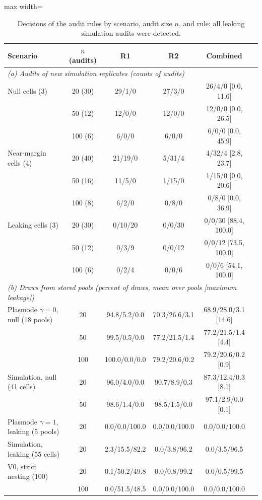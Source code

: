 \documentclass[final,1p,times]{elsarticle}
\begin{document}
\begin{table}[!htb]
\caption{Decisions of the audit rules by scenario, audit size $n$, and rule: all leaking simulation audits were detected.}\label{tab:oc}
\centering\scriptsize
\setlength{\tabcolsep}{2.5pt}
\begin{adjustbox}{max width=\textwidth}
\begin{tabular}{p{}ccccc}
\toprule
Scenario & $n$ (audits) & R1 & R2 & Combined \\
\midrule
\multicolumn{5}{l}{\textit{(a) Audits of new simulation replicates (counts of audits)}} \\
Null cells (3) & 20 (30) & 29/1/0 & 27/3/0 & 26/4/0 [0.0, 11.6] \\
 & 50 (12) & 12/0/0 & 12/0/0 & 12/0/0 [0.0, 26.5] \\
 & 100 (6) & 6/0/0 & 6/0/0 & 6/0/0 [0.0, 45.9] \\
Near-margin cells (4) & 20 (40) & 21/19/0 & 5/31/4 & 4/32/4 [2.8, 23.7] \\
 & 50 (16) & 11/5/0 & 1/15/0 & 1/15/0 [0.0, 20.6] \\
 & 100 (8) & 6/2/0 & 0/8/0 & 0/8/0 [0.0, 36.9] \\
Leaking cells (3) & 20 (30) & 0/10/20 & 0/0/30 & 0/0/30 [88.4, 100.0] \\
 & 50 (12) & 0/3/9 & 0/0/12 & 0/0/12 [73.5, 100.0] \\
 & 100 (6) & 0/2/4 & 0/0/6 & 0/0/6 [54.1, 100.0] \\
\midrule
\multicolumn{5}{l}{\textit{(b) Draws from stored pools (percent of draws, mean over pools [maximum leakage])}} \\
Plasmode $\gamma=0$, null (18 pools) & 20 & 94.8/5.2/0.0 & 70.3/26.6/3.1 & 68.9/28.0/3.1 [14.6] \\
 & 50 & 99.5/0.5/0.0 & 77.2/21.5/1.4 & 77.2/21.5/1.4 [4.4] \\
 & 100 & 100.0/0.0/0.0 & 79.2/20.6/0.2 & 79.2/20.6/0.2 [0.9] \\
Simulation, null (41 cells) & 20 & 96.0/4.0/0.0 & 90.7/8.9/0.3 & 87.3/12.4/0.3 [8.1] \\
 & 50 & 98.6/1.4/0.0 & 98.5/1.5/0.0 & 97.1/2.9/0.0 [0.1] \\
Plasmode $\gamma=1$, leaking (5 pools) & 20 & 0.0/0.0/100.0 & 0.0/0.0/100.0 & 0.0/0.0/100.0 \\
Simulation, leaking (55 cells) & 20 & 2.3/15.5/82.2 & 0.0/3.8/96.2 & 0.0/3.5/96.5 \\
V0, strict nesting (100) & 20 & 0.1/50.2/49.8 & 0.0/0.8/99.2 & 0.0/0.5/99.5 \\
 & 100 & 0.0/51.5/48.5 & 0.0/0.0/100.0 & 0.0/0.0/100.0 \\
\bottomrule
\end{tabular}
\end{adjustbox}


\end{table}
\end{document}
